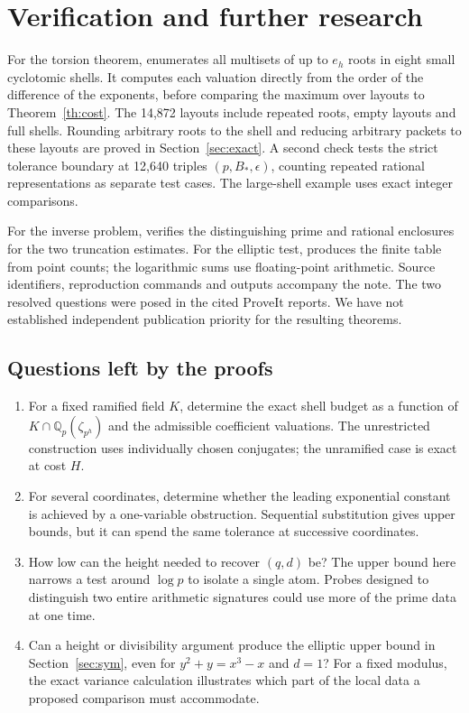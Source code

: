\documentclass[11pt]{article}
\begin{document}



\clearpage
\section{Verification and further research}
For the torsion theorem,  enumerates all multisets of up to $e_h$ roots in eight small cyclotomic shells. It computes each valuation directly from the order of the difference of the exponents, before comparing the maximum over layouts to Theorem~\ref{th:cost}. The 14,872 layouts include repeated roots, empty layouts and full shells. Rounding arbitrary roots to the shell and reducing arbitrary packets to these layouts are proved in Section~\ref{sec:exact}. A second check tests the strict tolerance boundary at 12,640 triples $(p,B_*,\epsilon)$, counting repeated rational representations as separate test cases. The large-shell example uses exact integer comparisons.

For the inverse problem,  verifies the distinguishing prime and rational enclosures for the two truncation estimates. For the elliptic test,  produces the finite table from point counts; the logarithmic sums use floating-point arithmetic. Source identifiers, reproduction commands and outputs accompany the note. The two resolved questions were posed in the cited ProveIt reports. We have not established independent publication priority for the resulting theorems.

\subsection*{Questions left by the proofs}
\begin{enumerate}
\item For a fixed ramified field $K$, determine the exact shell budget as a function of $K\cap\mathbb Q_p(\zeta_{p^h})$ and the admissible coefficient valuations. The unrestricted construction uses individually chosen conjugates; the unramified case is exact at cost $H$.
\item For several coordinates, determine whether the leading exponential constant is achieved by a one-variable obstruction. Sequential substitution gives upper bounds, but it can spend the same tolerance at successive coordinates.
\item How low can the height needed to recover $(q,d)$ be? The upper bound here narrows a test around $\log p$ to isolate a single atom. Probes designed to distinguish two entire arithmetic signatures could use more of the prime data at one time.
\item Can a height or divisibility argument produce the elliptic upper bound in Section~\ref{sec:sym}, even for $y^2+y=x^3-x$ and $d=1$? For a fixed modulus, the exact variance calculation illustrates which part of the local data a proposed comparison must accommodate.
\end{enumerate}
\end{document}
